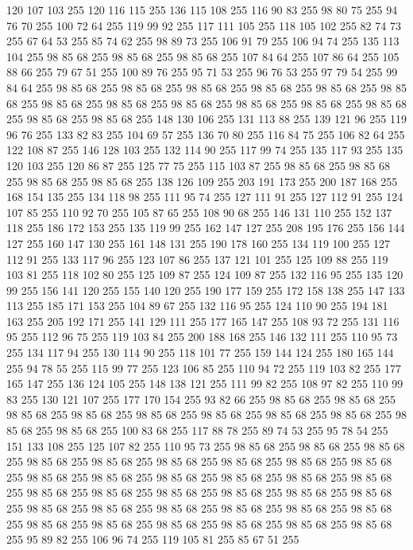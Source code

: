 120 107 103 255 120 116 115 255 136 115 108 255 116 90 83 255 98 80 75 255 94 76 70 255 100 72 64 255 119 99 92 255 117 111 105 255 118 105 102 255 82 74 73 255 67 64 53 255 85 74 62 255 98 89 73 255 106 91 79 255 106 94 74 255 135 113 104 255 98 85 68 255 98 85 68 255 98 85 68 255 107 84 64 255 107 86 64 255 105 88 66 255 79 67 51 255 100 89 76 255 95 71 53 255 96 76 53 255 97 79 54 255 99 84 64 255 98 85 68 255 98 85 68 255 98 85 68 255 98 85 68 255 98 85 68 255 98 85 68 255 98 85 68 255 98 85 68 255 98 85 68 255 98 85 68 255 98 85 68 255 98 85 68 255 98 85 68 255 98 85 68 255 148 130 106 255 131 113 88 255 139 121 96 255 119 96 76 255 133 82 83 255 104 69 57 255 136 70 80 255 116 84 75 255 106 82 64 255 122 108 87 255 146 128 103 255 132 114 90 255 117 99 74 255 135 117 93 255 135 120 103 255 120 86 87 255 125 77 75 255 115 103 87 255 98 85 68 255 98 85 68 255 98 85 68 255
98 85 68 255 138 126 109 255 203 191 173 255 200 187 168 255 168 154 135 255 134 118 98 255 111 95 74 255 127 111 91 255 127 112 91 255 124 107 85 255 110 92 70 255 105 87 65 255 108 90 68 255 146 131 110 255 152 137 118 255 186 172 153 255 135 119 99 255 162 147 127 255 208 195 176 255 156 144 127 255 160 147 130 255 161 148 131 255 190 178 160 255 134 119 100 255 127 112 91 255 133 117 96 255 123 107 86 255 137 121 101 255 125 109 88 255 119 103 81 255 118 102 80 255 125 109 87 255 124 109 87 255 132 116 95 255 135 120 99 255 156 141 120 255 155 140 120 255 190 177 159 255 172 158 138 255 147 133 113 255 185 171 153 255 104 89 67 255 132 116 95 255 124 110 90 255 194 181 163 255 205 192 171 255 141 129 111 255 177 165 147 255 108 93 72 255 131 116 95 255 112 96 75 255 119 103 84 255 200 188 168 255 146 132 111 255 110 95 73 255 134 117 94 255 130 114 90 255 118 101 77 255 159 144 124 255 180 165 144 255 94 78 55 255 115 99 77 255 123 106 85 255 110 94 72 255
119 103 82 255 177 165 147 255 136 124 105 255 148 138 121 255 111 99 82 255 108 97 82 255 110 99 83 255 130 121 107 255 177 170 154 255 93 82 66 255 98 85 68 255 98 85 68 255 98 85 68 255 98 85 68 255 98 85 68 255 98 85 68 255 98 85 68 255 98 85 68 255 98 85 68 255 98 85 68 255 100 83 68 255 117 88 78 255 89 74 53 255 95 78 54 255 151 133 108 255 125 107 82 255 110 95 73 255 98 85 68 255 98 85 68 255 98 85 68 255 98 85 68 255 98 85 68 255 98 85 68 255 98 85 68 255 98 85 68 255 98 85 68 255 98 85 68 255 98 85 68 255 98 85 68 255 98 85 68 255 98 85 68 255 98 85 68 255 98 85 68 255 98 85 68 255 98 85 68 255 98 85 68 255 98 85 68 255 98 85 68 255 98 85 68 255 98 85 68 255 98 85 68 255 98 85 68 255 98 85 68 255 98 85 68 255 98 85 68 255 98 85 68 255 98 85 68 255 98 85 68 255 98 85 68 255 98 85 68 255 95 89 82 255 106 96 74 255 119 105 81 255 85 67 51 255
